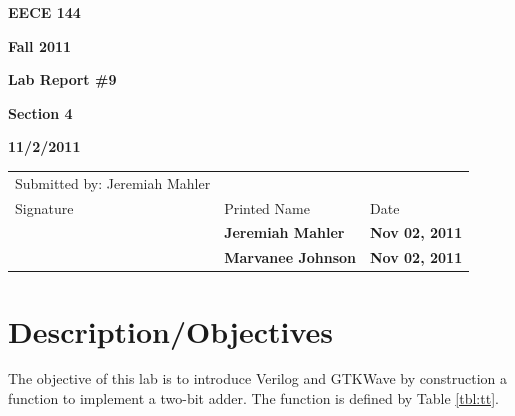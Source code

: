 \documentclass[12pt]{article}
\begin{document}
\centerline{\bf EECE 144}
\centerline{\bf Fall 2011}
\centerline{\bf}
\centerline{\bf Lab Report \#9}
\centerline{\bf Section 4}
\centerline{\bf 11/2/2011}
\begin{center}
\begin{tabularx}{\textwidth}[b]{X l l}
Submitted by: Jeremiah Mahler & & \\
Signature & Printed Name & Date \\
\hline
\multicolumn{1}{|X|}{} & \multicolumn{1}{|l|}{\bigstrut \bf Jeremiah Mahler} & \multicolumn{1}{|l|}{\bf Nov 02, 2011} \\
\hline
\multicolumn{1}{|X|}{} & \multicolumn{1}{|l|}{\bigstrut \bf Marvanee Johnson} & \multicolumn{1}{|l|}{\bf Nov 02, 2011} \\
\hline
\end{tabularx}
\end{center}

\section{Description/Objectives}

The objective of this lab is to introduce Verilog \cite{VERILOG}
and GTKWave \cite{GTKWAVE} by construction a function to implement
a two-bit adder.  The function is defined by Table \ref{tbl:tt}.
\end{document}
